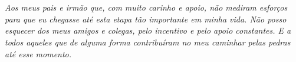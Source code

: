 
\chapter*{}
\vspace*{\fill}
\begin{text}
\centering
\noindent
\textit{Aos meus pais e irmão que, com muito carinho e apoio, não mediram esforços para que eu chegasse até esta etapa tão importante em minha vida. Não posso esquecer dos meus amigos e colegas, pelo incentivo e pelo apoio constantes. E a todos aqueles que de alguma forma contribuíram no meu caminhar pelas pedras até esse momento.}
\end{text}
\vspace*{\fill}

